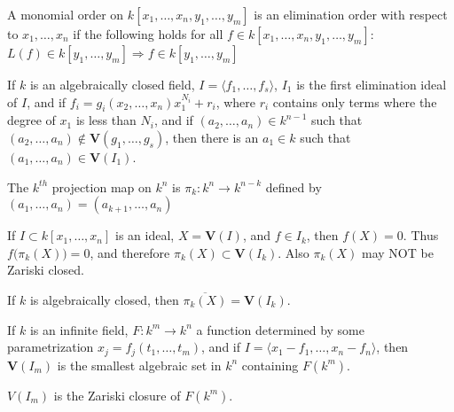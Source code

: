 \documentclass[crop=false,class=article,oneside]{standalone}
\begin{document}
        \begin{definition}
            A monomial order on
            $k[x_{1},\hdots,x_{n},y_{1},\hdots,y_{m}]$
            is an elimination order with respect to
            $x_{1},\hdots,x_{n}$ if the following holds for
            all $f\in{k}[x_{1},\hdots,x_{n},y_{1},\hdots,y_{m}]$:
            $L(f)\in{k}[y_{1},\hdots,y_{m}]%
             \Rightarrow{f}\in{k}[y_{1},\hdots,y_{m}]$
        \end{definition}
        \begin{theorem}
            If $k$ is an algebraically closed field,
            $I=\langle{f_{1}},\hdots,f_{s}\rangle$, $I_{1}$ is
            the first elimination ideal of $I$, and if
            $f_{i}=g_{i}(x_{2},\hdots,x_{n})x_{1}^{N_i}+r_{i}$,
            where $r_{i}$ contains only terms where the degree
            of $x_{1}$ is less than $N_{i}$, and if
            $(a_{2},\hdots,a_{n})\in{k}^{n-1}$ such that
            $(a_{2},\hdots,a_{n})\notin%
             \mathbf{V}(g_{1},\hdots,g_{s})$,
             then there is an $a_1 \in k$ such that
             $(a_{1},\hdots,a_{n})\in\mathbf{V}(I_1)$.
        \end{theorem}
        \begin{definition}
            The $k^{th}$ projection map on $k^{n}$ is
            $\pi_{k}:k^{n}\rightarrow k^{n-k}$ defined by
            $(a_{1},\hdots,a_{n})=(a_{k+1},\hdots,a_{n})$
        \end{definition}
        \begin{remark}
            If $I\subset{k}[x_{1},\hdots,x_{n}]$ is an ideal,
            $X=\mathbf{V}(I)$, and $f\in{I_{k}}$,
            then $f(X)=0$.
            Thus $f\big(\pi_{k}(X)\big)=0$, and therefore
            $\pi_{k}(X)\subset\mathbf{V}(I_k)$.
            Also $\pi_{k}(X)$ may NOT be Zariski closed.
        \end{remark}
        \begin{theorem}
            If $k$ is algebraically closed,
            then $\overline{\pi_k(X)}=\mathbf{V}(I_k)$.
        \end{theorem}
        \begin{theorem}
            If $k$ is an infinite field,
            $F:k^{m}\rightarrow{k^{n}}$ a function determined
            by some parametrization
            $x_{j}=f_{j}(t_{1},\hdots,t_{m})$, and if
            $I=\langle{x_{1}-f_{1}},\hdots,x_{n}-f_{n}\rangle$,
            then $\mathbf{V}(I_m)$ is the smallest algebraic
            set in $k^{n}$ containing $F(k^{m})$.
        \end{theorem}
        \begin{remark}
            $V(I_{m})$ is the Zariski closure of $F(k^{m})$.
        \end{remark}
\end{document}
